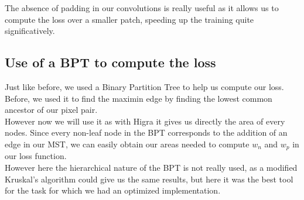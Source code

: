 The absence of padding in our convolutions is really useful as it allows us to
compute the loss over a smaller patch, speeding up the training quite
significatively.

\subsection{Use of a BPT to compute the loss}

Just like before, we used a Binary Partition Tree to help us compute our
loss.\\
Before, we used it to find the maximin edge by finding the lowest common
ancestor of our pixel pair.\\

However now we will use it as with Higra it gives us directly the area of
every nodes. Since every non-leaf node in the BPT corresponds to the addition
of an edge in our MST, we can easily obtain our areas needed to compute $w_n$
and $w_p$ in our loss function.\\

However here the hierarchical nature of the BPT is not really used, as a
modified Kruskal's algorithm could give us the same results, but here it was
the best tool for the task for which we had an optimized implementation.

